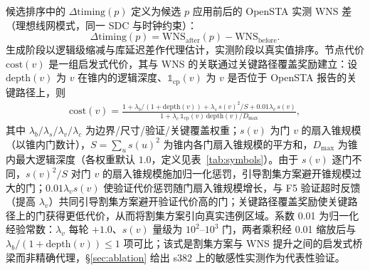\documentclass[journal]{IEEEtran}
\begin{document}
候选排序中的 $\Delta\mathrm{timing}(p)$ 定义为候选 $p$ 应用前后的 OpenSTA 实测 WNS 差（理想线网模式，同一 SDC 与时钟约束）：
\begin{equation}\label{eq:dtiming}
\Delta\mathrm{timing}(p) = \mathrm{WNS}_{\mathrm{after}}(p) - \mathrm{WNS}_{\mathrm{before}}.
\end{equation}
生成阶段以逻辑级缩减与库延迟差作代理估计，实测阶段以真实值排序。节点代价 $\mathrm{cost}(v)$ 是一组启发式代价，其与 WNS 的关联通过关键路径覆盖奖励建立：设 $\mathrm{depth}(v)$ 为 $v$ 在锥内的逻辑深度、$\mathbb{1}_{\mathrm{cp}}(v)$ 为 $v$ 是否位于 OpenSTA 报告的关键路径上，则
{\small
\begin{equation}
\label{eq:cost}
\begin{split}
\mathrm{cost}(v) = \frac{1 + \lambda_b/(1+\mathrm{depth}(v)) + \lambda_s\,s(v)^2/S + 0.01\lambda_v\,s(v)}{1 + \lambda_c\,\mathbb{1}_{\mathrm{cp}}(v)\,\mathrm{depth}(v)/D_{\max}},
\end{split}
\end{equation}
}
其中 $\lambda_b/\lambda_s/\lambda_v/\lambda_c$ 为边界/尺寸/验证/关键覆盖权重；$s(v)$ 为门 $v$ 的扇入锥规模（以锥内门数计），$S=\sum_u s(u)^2$ 为锥内各门扇入锥规模的平方和，$D_{\max}$ 为锥内最大逻辑深度（各权重默认 $1.0$，定义见表~\ref{tab:symbols}）。由于 $s(v)$ 逐门不同，$s(v)^2/S$ 对门 $v$ 的扇入锥规模施加归一化惩罚，引导割集方案避开锥规模过大的门；$0.01\lambda_v s(v)$ 使验证代价惩罚随门扇入锥规模增长，与 F5 验证超时反馈（提高 $\lambda_v$）共同引导割集方案避开验证代价高的门；关键路径覆盖奖励使关键路径上的门获得更低代价，从而将割集方案引向真实违例区域。系数 0.01 为归一化经验常数：$\lambda_v$ 每轮 $+1.0$、$s(v)$ 量级为 $10^2$--$10^3$ 门，两者乘积经 0.01 缩放后与 $\lambda_b/(1+\mathrm{depth}(v))\le 1$ 项可比；该式是割集方案与 WNS 提升之间的启发式桥梁而非精确代理，\S\ref{sec:ablation} 给出 s382 上的敏感性实测作为代表性验证。
\end{document}
